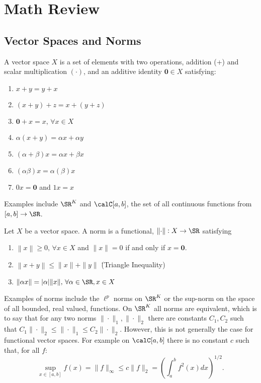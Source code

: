 \section{Math Review}%
\label{sec:math-review}

\subsection{Vector Spaces and Norms}%

\begin{definition}
	\label{def:vector-space}
	A vector space \(X\) is a set of elements with two operations, addition (+) and scalar multiplication  \((\cdot)\), and an additive identity \(\mathbf{0} \in X\) satisfying:
	 \begin{enumerate}
		 \item \( x + y = y+ x\) 
		 \item \((x+y)+z = x + (y+z)\)
		 \item \( \mathbf{0} + x = x,\, \forall x \in X\)
		 \item \(\alpha(x+y) = \alpha x + \alpha y\)
		 \item \((\alpha + \beta)x = \alpha x + \beta x\)
		 \item \((\alpha\beta)x = \alpha(\beta)x\)
		 \item \(0x = \mathbf{0}\) and  \(1x = x\) 
	\end{enumerate}
\end{definition}
Examples include \(\SR^K\) and  \(\calC[a,b]\), the set of all continuous functions from \([a,b] \to \SR\).

\begin{definition}[Norm]
	\label{def:norm}
	Let \(X\) be a vector space.  A norm is a functional,  \(\left\|\cdot\right\|:X \to \SR\) satisfying
	\begin{enumerate}
		\item \(\left\|x\right\|\geq 0,\,\forall x \in X\) and \(\|x\|=0\) if and only if \(x = \mathbf{0}\).
		\item \(\left\|x+y\right\|\leq \|x\| + \|y\|\) \. (Triangle Inequality) 
		\item \(\|\alpha x\| = |\alpha|\|x\|,\,\forall \alpha \in \SR, x \in X\)
	\end{enumerate}
\end{definition}
Examples of norms include the \(\ell^p\) norms on  \(\SR^K\) or the sup-norm on the space of all bounded, real valued, functions. On \(\SR^K\) all norms are equivalent, which is to say that for any two norms  \(\|\cdot\|_1, \|\cdot\|_2\) there are constants \(C_1, C_2\) such that  \(C_1\|\cdot\|_2 \leq \|\cdot\|_1 \leq C_2 \|\cdot\|_2\). However, this is not generally the case for functional vector spaces. For example on \(\calC[a,b]\) there is no constant \(c\) such that, for all \(f\):
 \[
	 \sup_{x\in[a,b]}f(x) = \|f\|_\infty \leq c \|f\|_2 = \left(\int_{a}^{b} f^2(x) dx\right)^{1/2}
.\] 

